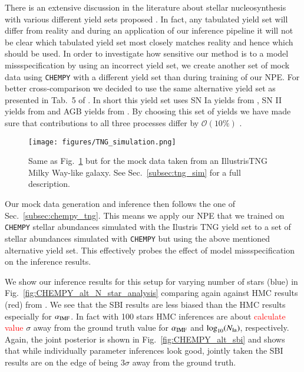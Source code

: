 \documentclass{aa}
\begin{document}
There is an extensive discussion in the literature about stellar nucleosynthesis with various different yield sets proposed \citep[see e.g. discussion in][]{Rybizki_2017}. In fact, any tabulated yield set will differ from reality and during an application of our inference pipeline it will not be clear which tabulated yield set most closely matches reality and hence which should be used.
In order to investigate how sensitive our method is to a model missspecification by using an incorrect yield set, we create another set of mock data using \texttt{CHEMPY} with a different yield set than during training of our NPE. For better cross-comparison we decided to use the same alternative yield set as presented in Tab.~5 of \citep{Philcox_2019}. In short this yield set uses SN Ia yields from \citet{2003NuPhA.718..139T}, SN II yields from \citet{2013ARA&A..51..457N} and AGB yields from \citet{2016ApJ...825...26K}. By choosing this set of yields we have made sure that contributions to all three processes differ by $\mathcal{O}(10\%)$ \citep[see Sec.~6.2 of][for more details]{Philcox_2019}.

\begin{figure}
    \centering
    \texttt{[image: figures/TNG\_simulation.png]}
    \vspace{-.25cm}
    \caption{Same as Fig.~\ref{fig:CHEMPY_TNG_sim_sbi} but for the mock data taken from an IllustrisTNG Milky Way-like galaxy. See Sec.~\ref{subsec:tng_sim} for a full description.}
    \label{fig:CHEMPY_TNG_sim_sbi} 
\end{figure}

Our mock data generation and inference then follows the one of Sec.~\ref{subsec:chempy_tng}. This means we apply our NPE that we trained on \texttt{CHEMPY} stellar abundances simulated with the Ilustris TNG yield set to a set of stellar abundances simulated with \texttt{CHEMPY} but using the above mentioned alternative yield set. This effectively probes the effect of model missspecification on the inference results.

We show our inference results for this setup for varying number of stars (blue) in Fig.~\ref{fig:CHEMPY_alt_N_star_analysis} comparing again against HMC results (red) from \citet{Philcox_2019}. We see that the SBI results are less biased than the HMC results especially for $\alpha_{\rm IMF}$. In fact with 100 stars HMC inferences are about \textcolor{red}{calculate value} $\sigma$ away from the ground truth value for $\alpha_{\rm IMF}$ and $\log_{10}(N_{\rm Ia})$, respectively. Again, the joint posterior is shown in Fig.~\ref{fig:CHEMPY_alt_sbi} and shows that while individually parameter inferences look good, jointly taken the SBI results are on the edge of being $3\sigma$ away from the ground truth.
\end{document}
